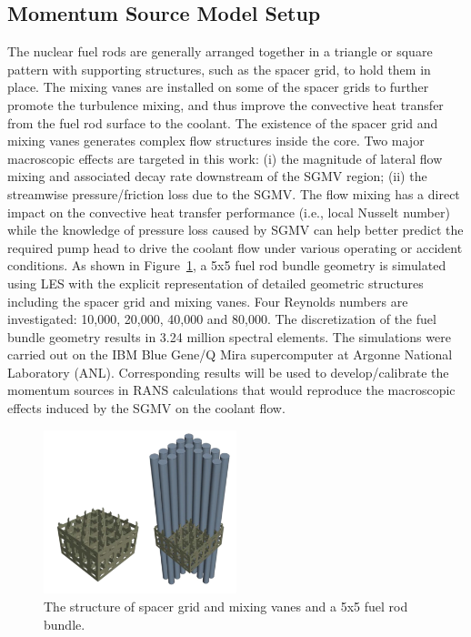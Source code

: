 \subsection{Momentum Source Model Setup}
\label{sec:msm2}

The nuclear fuel rods are generally arranged together in a triangle or square pattern with supporting structures, such as the spacer grid, to hold them in place.
The mixing vanes are installed on some of the spacer grids to further promote the turbulence mixing, and thus improve the convective heat transfer from the fuel rod surface to the coolant.
The existence of the spacer grid and mixing vanes generates complex flow structures inside the core. Two major macroscopic effects are targeted in this work:
(i) the magnitude of lateral flow mixing and associated decay rate downstream of the SGMV region;
(ii) the streamwise pressure/friction loss due to the SGMV.
The flow mixing has a direct impact on the convective heat transfer performance (i.e., local Nusselt number) while the knowledge of pressure loss caused by SGMV can help better predict the required pump head to drive the coolant flow under various operating or accident conditions.
As shown in Figure~\ref{fig:sgmvcad}, a 5x5 fuel rod bundle geometry is simulated using LES with the explicit representation of detailed geometric structures including the spacer grid and mixing vanes.
Four Reynolds numbers are investigated: 10,000, 20,000, 40,000 and 80,000.
The discretization of the fuel bundle geometry results in 3.24 million spectral elements. The simulations were carried out on the IBM Blue Gene/Q Mira supercomputer at Argonne National Laboratory (ANL).
Corresponding results will be used to develop/calibrate the momentum sources in RANS calculations that would reproduce the macroscopic effects induced by the SGMV on the coolant flow.

\begin{figure}[!ht]
\centering
\includegraphics[width=0.5\textwidth]{./figures/3DModel_of_SGMV.png}
\caption{The structure of spacer grid and mixing vanes and a 5x5 fuel rod bundle. }
\label{fig:sgmvcad}
\end{figure}


